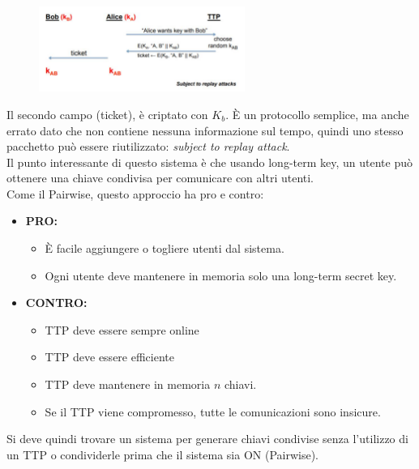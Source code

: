 \documentclass[a4paper,12pt]{article}
\begin{document}
\begin{figure}[H]
	\centering
	\includegraphics[width=0.6\textwidth]{img/ttp-protocol.png}
\end{figure}
Il secondo campo (ticket), è criptato con $K_b$. È un protocollo semplice, ma anche errato dato che non contiene nessuna informazione sul tempo, quindi uno stesso pacchetto può essere riutilizzato: \textit{subject to replay attack}. \\
Il punto interessante di questo sistema è che usando long-term key, un utente può ottenere una chiave condivisa per comunicare con altri utenti. \\
Come il Pairwise, questo approccio ha pro e contro:
\begin{itemize}
	\item \textbf{PRO:}
	\begin{itemize}
		\item È facile aggiungere o togliere utenti dal sistema.
		\item Ogni utente deve mantenere in memoria solo una long-term secret key.
	\end{itemize}
	\item \textbf{CONTRO:}
	\begin{itemize}
		\item TTP deve essere sempre online
		\item TTP deve essere efficiente
		\item TTP deve mantenere in memoria $n$ chiavi.
		\item Se il TTP viene compromesso, tutte le comunicazioni sono insicure.
	\end{itemize}
\end{itemize}
Si deve quindi trovare un sistema per generare chiavi condivise senza l'utilizzo di un TTP o condividerle prima che il sistema sia ON (Pairwise).
\end{document}
